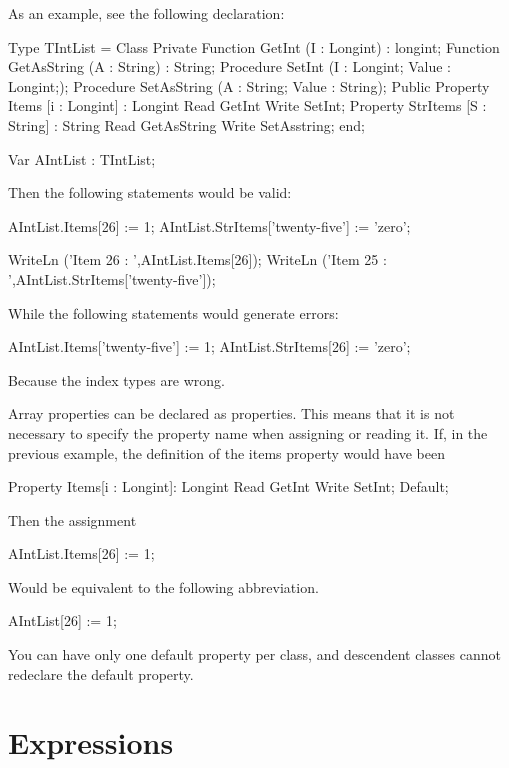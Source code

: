 \documentclass{report}
\begin{document}
As an example, see the following declaration:
\begin{listing}
Type TIntList = Class
      Private
      Function GetInt (I : Longint) : longint;
      Function GetAsString (A : String) : String;
      Procedure SetInt (I : Longint; Value : Longint;);
      Procedure SetAsString (A : String; Value : String);
      Public
      Property Items [i : Longint] : Longint Read GetInt 
                                             Write SetInt;
      Property StrItems [S : String] : String Read GetAsString 
                                              Write SetAsstring;
      end;

Var AIntList : TIntList;
\end{listing}
Then the following statements would be valid:
\begin{listing}
AIntList.Items[26] := 1;
AIntList.StrItems['twenty-five'] := 'zero';

WriteLn ('Item 26 : ',AIntList.Items[26]);
WriteLn ('Item 25 : ',AIntList.StrItems['twenty-five']);
\end{listing}
While the following statements would generate errors:
\begin{listing}
AIntList.Items['twenty-five'] := 1;
AIntList.StrItems[26] := 'zero';
\end{listing}
Because the index types are wrong.

Array properties can be declared as  properties. This means that
it is not necessary to specify the property name when assigning or reading
it. If, in the previous example, the definition of the items property would 
have been
\begin{listing}
 Property Items[i : Longint]: Longint Read GetInt 
                                      Write SetInt; Default;
\end{listing}
Then the assignment
\begin{listing}
AIntList.Items[26] := 1;
\end{listing}
Would be equivalent to the following abbreviation.
\begin{listing}
AIntList[26] := 1;
\end{listing}
You can have only one default property per class, and descendent classes
cannot redeclare the default property.

\chapter{Expressions}
\label{ch:Expressions}
\end{document}
